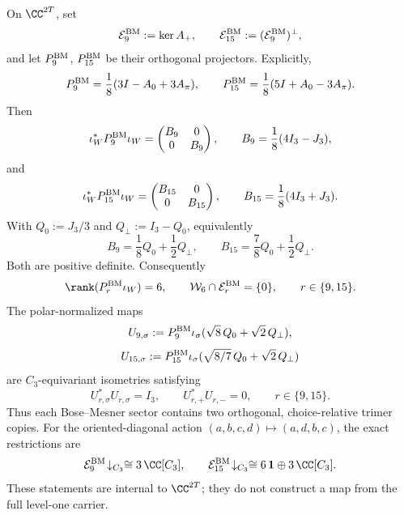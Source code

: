 \documentclass[11pt]{article}
\begin{document}
\begin{theorem}
\label{p1:thm:s3one-trimer-bose-mesner-interface}
On \(\CC^{2T}\), set
\[
 \mathcal E_9^{\rm BM}:=\ker A_+,
 \qquad
 \mathcal E_{15}^{\rm BM}:=(\mathcal E_9^{\rm BM})^\perp,
\]
and let \(P_9^{\rm BM}\), \(P_{15}^{\rm BM}\) be their orthogonal
projectors.  Explicitly,
\[
 P_9^{\rm BM}=\frac18(3I-A_0+3A_\pi),
 \qquad
 P_{15}^{\rm BM}=\frac18(5I+A_0-3A_\pi).
\]
Then
\[
 \iota_W^*P_9^{\rm BM}\iota_W
 =\begin{pmatrix}B_9&0\\0&B_9\end{pmatrix},
 \qquad
 B_9=\frac18(4I_3-J_3),
\]
and
\[
 \iota_W^*P_{15}^{\rm BM}\iota_W
 =\begin{pmatrix}B_{15}&0\\0&B_{15}\end{pmatrix},
 \qquad
 B_{15}=\frac18(4I_3+J_3).
\]
With \(Q_0:=J_3/3\) and \(Q_\perp:=I_3-Q_0\), equivalently
\[
 B_9=\frac18Q_0+\frac12Q_\perp,
 \qquad
 B_{15}=\frac78Q_0+\frac12Q_\perp.
\]
Both are positive definite.  Consequently
\[
 \rank(P_r^{\rm BM}\iota_W)=6,
 \qquad
 \mathcal W_6\cap\mathcal E_r^{\rm BM}=\{0\},
 \qquad r\in\{9,15\}.
\]
The polar-normalized maps
\[
 U_{9,\sigma}
 :=P_9^{\rm BM}\iota_\sigma
   (\sqrt8\,Q_0+\sqrt2\,Q_\perp),
\]
\[
 U_{15,\sigma}
 :=P_{15}^{\rm BM}\iota_\sigma
   (\sqrt{8/7}\,Q_0+\sqrt2\,Q_\perp)
\]
are \(C_3\)-equivariant isometries satisfying
\[
 U_{r,\sigma}^*U_{r,\sigma}=I_3,
 \qquad
 U_{r,+}^*U_{r,-}=0,
 \qquad r\in\{9,15\}.
\]
Thus each Bose--Mesner sector contains two orthogonal, choice-relative
trimer copies.  For the oriented-diagonal action
\((a,b,c,d)\mapsto(a,d,b,c)\), the exact restrictions are
\[
 \mathcal E_9^{\rm BM}\!\downarrow_{C_3}
 \cong3\,\CC[C_3],
 \qquad
 \mathcal E_{15}^{\rm BM}\!\downarrow_{C_3}
 \cong6\,\mathbf1\oplus3\,\CC[C_3].
\]
These statements are internal to \(\CC^{2T}\); they do not construct a map
from the full level-one carrier.
\end{theorem}
\end{document}
